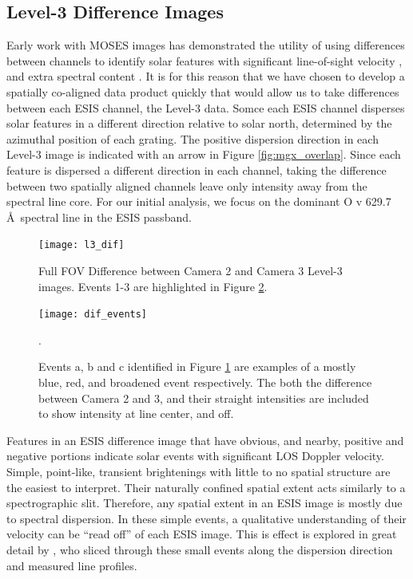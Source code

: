 {    \subsection{Level-3 Difference Images}
    	Early work with MOSES images has demonstrated the utility of using differences between channels to identify solar features with significant line-of-sight velocity \citep{Fox2010,FoxPhD,RustPhD,Rust2019}, and extra spectral content \citep{RustPhD, Rust2019,Parker2021}.  
    	It is for this reason that we have chosen to develop a spatially co-aligned data product quickly that would allow us to take differences between each ESIS channel, the Level-3 data.
    	Somce each ESIS channel disperses solar features in a different direction relative to solar north, determined by the azimuthal position of each grating.
    	The positive dispersion direction in each Level-3 image is indicated with an arrow in Figure \ref{fig:mgx_overlap}.
    	Since each feature is dispersed a different direction in each channel, taking the difference between two spatially aligned channels leave only intensity away from the spectral line core.
    	For our initial analysis, we focus on the dominant O {\sc v} 629.7 \AA \ spectral line in the ESIS passband.
   		
   		\begin{figure}[htb!]
   			\centering
   			\texttt{[image: l3\_dif]}
   			\caption{Full FOV Difference between Camera 2 and Camera 3 Level-3 images.  Events 1-3 are highlighted in Figure \ref{fig:dif_events}.}
   			\label{fig:l3_dif}
   		\end{figure}
   	
 		\begin{figure}[htb!]
   			\centering
   			\texttt{[image: dif\_events]}
   			\caption{Events a, b and c identified in Figure \ref{fig:l3_dif} are examples of a mostly blue, red, and broadened event respectively. The both the difference between Camera 2 and 3, and their straight intensities are included to show intensity at line center, and off.
   			}
   			\label{fig:dif_events}. 
   		\end{figure}

    	Features in an ESIS difference image that have obvious, and nearby, positive and negative portions indicate solar events with significant LOS Doppler velocity.
    	Simple, point-like, transient brightenings with little to no spatial structure are the easiest to interpret.
    	Their naturally confined spatial extent acts similarly to a spectrographic slit.
    	Therefore, any spatial extent in an ESIS image is mostly due to spectral dispersion.
    	In these simple events, a qualitative understanding of their velocity can be ``read off'' of each ESIS image.
    	This is effect is explored in great detail by \citet{Rust2019}, who sliced through these small events along the dispersion direction and measured line profiles.
    	
}
